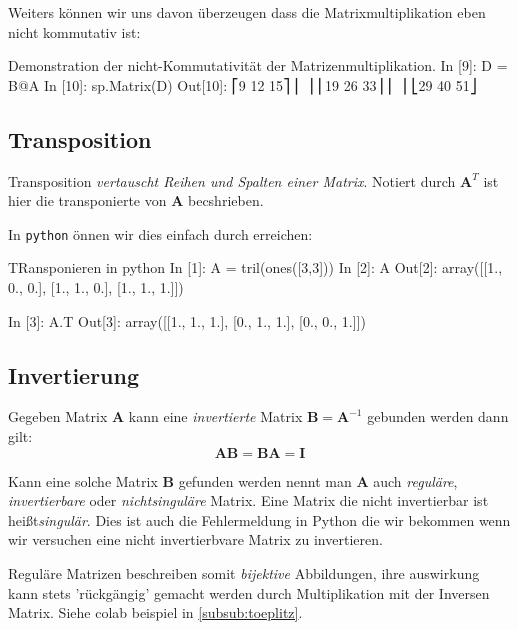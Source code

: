 Weiters können wir uns davon überzeugen dass die Matrixmultiplikation eben nicht kommutativ ist:
\begin{python}{Demonstration der nicht-Kommutativität der Matrizenmultiplikation.}
In [9]: D = B@A
In [10]: sp.Matrix(D)
Out[10]:
⎡9   12  15⎤
⎢          ⎥
⎢19  26  33⎥
⎢          ⎥
⎣29  40  51⎦
\end{python}

\subsection*{Transposition}

Transposition \emph{vertauscht Reihen und Spalten einer Matrix}. Notiert durch $\mathbf{A}^{T}$ ist hier die transponierte von $\mathbf{A}$ becshrieben.

In \texttt{python} önnen wir dies einfach durch  erreichen:

\begin{python}{TRansponieren in python}
In [1]: A = tril(ones([3,3]))
In [2]: A
Out[2]:
array([[1., 0., 0.],
       [1., 1., 0.],
       [1., 1., 1.]])

In [3]: A.T
Out[3]:
array([[1., 1., 1.],
       [0., 1., 1.],
       [0., 0., 1.]])
\end{python}



\subsection*{Invertierung}



Gegeben Matrix $\mathbf{A}$ kann eine \emph{invertierte} Matrix $\mathbf{B} = \mathbf{A}^{-1}$ gebunden werden dann gilt:
\begin{equation}
\mathbf {AB} =\mathbf {BA} =\mathbf {I}
\end{equation}

Kann eine solche Matrix $\mathbf{B}$ gefunden werden nennt man $\mathbf{A}$ auch \emph{reguläre}, \emph{invertierbare} oder \emph{nichtsinguläre} Matrix.
Eine Matrix die nicht invertierbar ist heißt\emph{singulär}. Dies ist auch die Fehlermeldung in Python die wir bekommen wenn wir versuchen eine nicht invertierbvare Matrix zu invertieren.

Reguläre Matrizen beschreiben somit \emph{bijektive} Abbildungen, ihre auswirkung kann stets 'rückgängig' gemacht werden durch Multiplikation mit der Inversen Matrix.
Siehe colab beispiel in \ref{subsub:toeplitz}.

